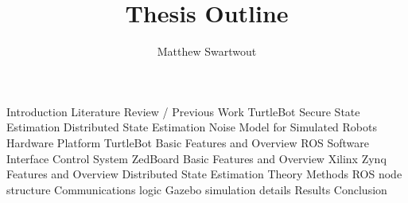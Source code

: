 \documentclass{article}
\begin{document}
\title{Thesis Outline}
\author{Matthew Swartwout}
\maketitle

\begin{outline}
\1 Introduction
\1 Literature Review / Previous Work
    \2 TurtleBot
    \2 Secure State Estimation
    \2 Distributed State Estimation
    \2 Noise Model for Simulated Robots
\1 Hardware Platform
    \2 TurtleBot
        \3 Basic Features and Overview
        \3 ROS Software Interface
        \3 Control System
    \2 ZedBoard
        \3 Basic Features and Overview
        \3 Xilinx Zynq Features and Overview
\1 Distributed State Estimation
    \2 Theory
    \2 Methods
        \3 ROS node structure
        \3 Communications logic
        \3 Gazebo simulation details
\1 Results
\1 Conclusion
\end{outline}
\end{document}
